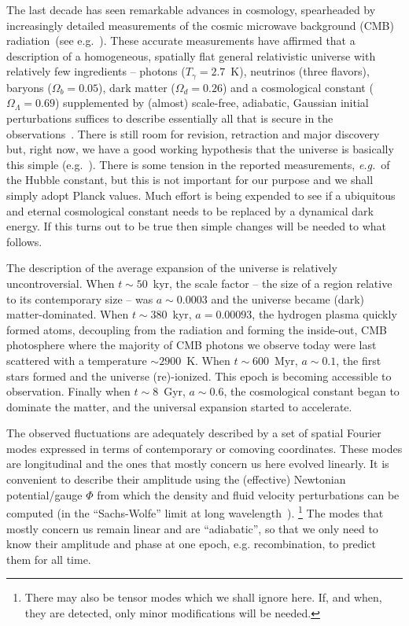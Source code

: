 \documentclass[psfig,11pt]{article}
\def\eg{{\it e.g.}\ }
\def\ni{\noindent}
\begin{document}
\ni{\bf Contents:}
The last decade has seen remarkable advances in cosmology, spearheaded by increasingly detailed measurements of the cosmic microwave background (CMB) radiation~(see e.g.\ \cite{Planck2015maps,Planck2015cosmopara}).
These accurate measurements have affirmed that a description of a homogeneous, spatially flat general relativistic universe with relatively few ingredients -- photons ($T_\gamma=2.7$~K), neutrinos (three flavors), baryons ($\Omega_b=0.05$), dark matter ($\Omega_d=0.26$) and a cosmological constant ($\Omega_\Lambda=0.69$) supplemented by (almost) scale-free, adiabatic, Gaussian initial perturbations suffices to describe essentially all that is secure in the observations~\cite{Planck2015cosmopara}. There is still room for revision, retraction and major discovery but, right now, we have a good working hypothesis that the universe is basically this simple (e.g.~\cite{Weinberg2008, Schneider2015}). There is some tension in the reported measurements, \eg of the Hubble constant, but this is not important for our purpose and we shall simply adopt Planck values. Much effort is being expended to see if a ubiquitous and eternal cosmological constant needs to be replaced by a dynamical dark energy. If this turns out to be true then simple changes will be needed to what follows.

\ni{\bf Evolution:}
The description of the average expansion of the universe is relatively uncontroversial. When  $t\sim 50$~kyr,  the scale factor -- the size of a region relative to its contemporary size -- was $a\sim0.0003$ and the universe became (dark) matter-dominated. When $t\sim380$~kyr, $a=0.00093$, the hydrogen plasma quickly formed atoms, decoupling from the radiation and forming the inside-out, CMB photosphere where the majority of CMB photons we observe today were last scattered with a temperature $\sim2900$~K. When $t\sim600$~Myr, $a\sim0.1$, the first stars formed and the universe (re)-ionized. This epoch is becoming accessible to observation. Finally when $t\sim8$~Gyr, $a\sim0.6$, the cosmological constant began to dominate the matter, and the universal expansion started to accelerate.

\ni{\bf Fluctuations:}
The observed fluctuations are adequately described by a set of spatial Fourier modes expressed in terms of contemporary or comoving coordinates. These modes are longitudinal and the ones that mostly concern us here evolved linearly. It is convenient to describe their amplitude using the (effective) Newtonian potential/gauge $\Phi$ from which the density and fluid velocity perturbations can be computed (in the ``Sachs-Wolfe'' limit at long wavelength~\cite{Sachs1967}). \footnote{There may also be tensor modes which we shall ignore here. If, and when, they are detected, only minor modifications will be needed.} The modes that mostly concern us remain linear and are ``adiabatic'', so that we only need to know their amplitude and phase at one epoch, e.g. recombination, to predict them for all time.
\end{document}
